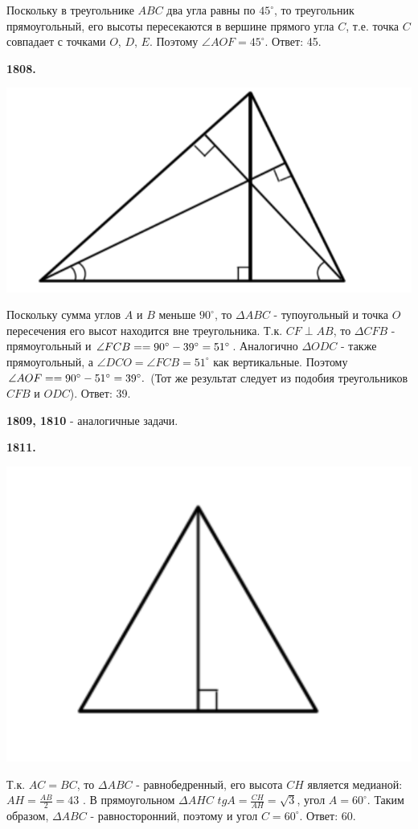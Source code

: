 Поскольку в треугольнике $ABC$ два угла равны по $45^\circ$, то треугольник прямоугольный, его высоты пересекаются в вершине прямого угла $C$, т.е. точка $C$ совпадает с точками $O$, $D$, $E$. Поэтому $\angle AOF = 45^\circ$. \newline \null \hspace*{\fill} Ответ: 45.

\textbf{1808.}

{\centering \includegraphics[width=0.4\linewidth]{Geometry/Content/16.png}
	
}

Поскольку сумма углов $A$ и $B$ меньше $90^\circ$, то $\Delta ABC$ - тупоугольный и точка $O$ пересечения его высот находится вне треугольника. Т.к. $CF \perp AB$, то $\Delta CFB$ - прямоугольный и $\angle FCB = \linebreak= 90^\circ - 39^\circ = 51^\circ$.  Аналогично $\Delta ODC$ - также прямоугольный, а $\angle DCO = \angle FCB = 51^\circ$ как вертикальные. Поэтому $\angle AOF = \linebreak=90^\circ - 51^\circ = 39^\circ.$ (Тот же результат следует из подобия треугольников $CFB$ и $ODC$). \newline \null \hspace*{\fill} Ответ: 39.

\textbf{1809, 1810} - аналогичные задачи.

\textbf{1811.}

{\centering \includegraphics[width=0.5\linewidth]{Geometry/Content/17.png}
	
}

Т.к. $AC=BC$, то $\Delta ABC$ - равнобедренный, его высота $CH$ является медианой: $AH = \frac{AB}{2}=43$ . В прямоугольном $\Delta AHC$ $tgA=\frac{CH}{AH} = \sqrt{3}$, угол $A = 60^\circ$. Таким образом, $\Delta ABC$ - равносторонний, поэтому и угол $C = 60^\circ.$
\newline \null \hspace*{\fill} Ответ: 60.


